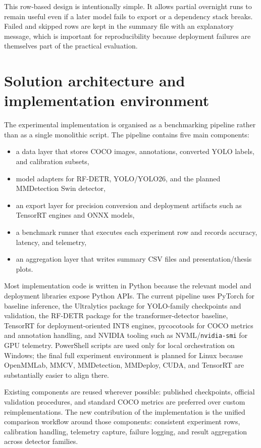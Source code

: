 \documentclass[a4paper,11pt,twoside]{report}
\theoremstyle{definition}
\begin{document}
This row-based design is intentionally simple. It allows partial overnight runs to remain useful even if a later model fails to export or a dependency stack breaks. Failed and skipped rows are kept in the summary file with an explanatory message, which is important for reproducibility because deployment failures are themselves part of the practical evaluation.

\section{Solution architecture and implementation environment}

The experimental implementation is organised as a benchmarking pipeline rather than as a single monolithic script. The pipeline contains five main components:

\begin{itemize}
    \item a data layer that stores COCO images, annotations, converted YOLO labels, and calibration subsets,
    \item model adapters for RF-DETR, YOLO/YOLO26, and the planned MMDetection Swin detector,
    \item an export layer for precision conversion and deployment artifacts such as TensorRT engines and ONNX models,
    \item a benchmark runner that executes each experiment row and records accuracy, latency, and telemetry,
    \item an aggregation layer that writes summary CSV files and presentation/thesis plots.
\end{itemize}

Most implementation code is written in Python because the relevant model and deployment libraries expose Python APIs. The current pipeline uses PyTorch for baseline inference, the Ultralytics package for YOLO-family checkpoints and validation, the RF-DETR package for the transformer-detector baseline, TensorRT for deployment-oriented INT8 engines, pycocotools for COCO metrics and annotation handling, and NVIDIA tooling such as NVML/\texttt{nvidia-smi} for GPU telemetry. PowerShell scripts are used only for local orchestration on Windows; the final full experiment environment is planned for Linux because OpenMMLab, MMCV, MMDetection, MMDeploy, CUDA, and TensorRT are substantially easier to align there.

Existing components are reused wherever possible: published checkpoints, official validation procedures, and standard COCO metrics are preferred over custom reimplementations. The new contribution of the implementation is the unified comparison workflow around those components: consistent experiment rows, calibration handling, telemetry capture, failure logging, and result aggregation across detector families.
\end{document}
